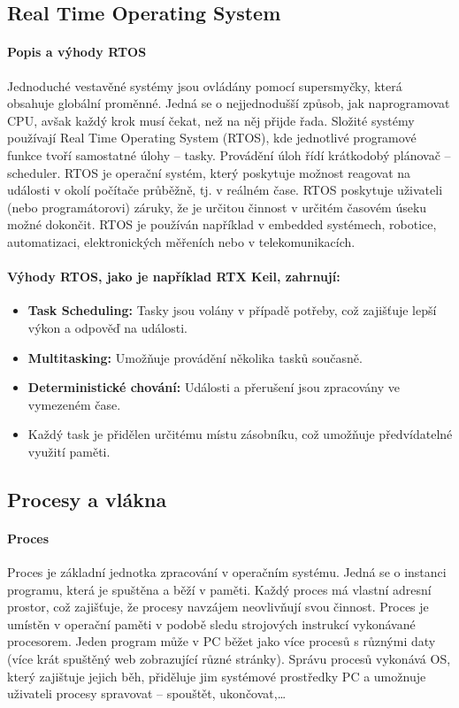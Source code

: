 \subsection{Real Time Operating System}

\paragraph{Popis a výhody RTOS}
Jednoduché vestavěné systémy jsou ovládány pomocí supersmyčky, která obsahuje globální proměnné. Jedná se o nejjednodušší způsob, jak naprogramovat CPU, avšak každý krok musí čekat, než na něj přijde řada. Složité systémy používají Real Time Operating System (RTOS), kde jednotlivé programové funkce tvoří samostatné úlohy – tasky. Provádění úloh řídí krátkodobý plánovač – scheduler. RTOS je operační systém, který poskytuje možnost reagovat na události v okolí počítače průběžně, tj. v reálném čase. RTOS poskytuje uživateli (nebo programátorovi) záruky, že je určitou činnost v určitém časovém úseku možné dokončit. RTOS je používán například v embedded systémech, robotice, automatizaci, elektronických měřeních nebo v telekomunikacích.

\paragraph{Výhody RTOS, jako je například RTX Keil, zahrnují:}
\begin{itemize}
    \item \textbf{Task Scheduling:} Tasky jsou volány v případě potřeby, což zajišťuje lepší výkon a odpověď na události.
    \item \textbf{Multitasking:} Umožňuje provádění několika tasků současně.
    \item \textbf{Deterministické chování:} Události a přerušení jsou zpracovány ve vymezeném čase.
    \item Každý task je přidělen určitému místu zásobníku, což umožňuje předvídatelné využití paměti.
\end{itemize}

\subsection{Procesy a vlákna}
\paragraph{Proces}
Proces je základní jednotka zpracování v operačním systému. Jedná se o instanci programu, která je spuštěna a běží v paměti. Každý proces má vlastní adresní prostor, což zajišťuje, že procesy navzájem neovlivňují svou činnost. Proces je umístěn v operační paměti v podobě sledu strojových instrukcí vykonávané procesorem. Jeden program může v PC běžet jako více procesů s různými daty (více krát spuštěný web zobrazující různé stránky). Správu procesů vykonává OS, který zajištuje jejich běh, přiděluje jim systémové prostředky PC a umožnuje uživateli procesy spravovat – spouštět, ukončovat,…
